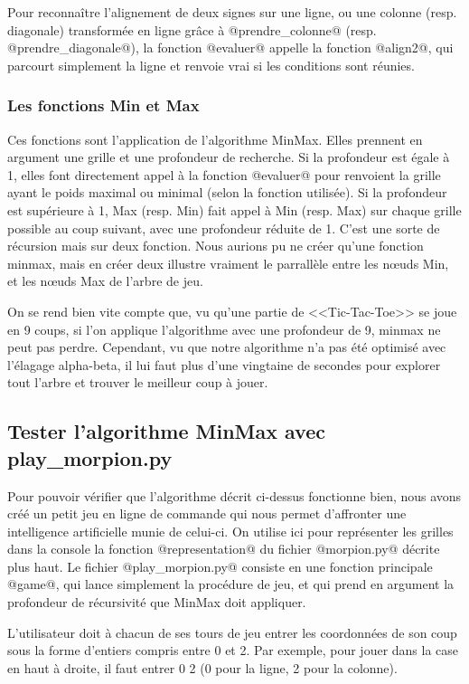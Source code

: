 \documentclass{article}
\begin{document}
Pour reconnaître l'alignement de deux signes sur une ligne, ou une colonne (resp. diagonale) transformée en ligne grâce à @prendre\_colonne@ (resp. @prendre\_diagonale@), la fonction @evaluer@ appelle la fonction @align2@, qui parcourt simplement la ligne et renvoie vrai si les conditions sont réunies.

\subsubsection{Les fonctions Min et Max}

Ces fonctions sont l'application de l'algorithme MinMax. Elles prennent en argument une grille et une profondeur de recherche. Si la profondeur est égale à 1, elles font directement appel à la fonction @evaluer@ pour renvoient la grille ayant le poids maximal ou minimal (selon la fonction utilisée). Si la profondeur est supérieure à 1, Max (resp. Min) fait appel à Min (resp. Max) sur chaque grille possible au coup suivant, avec une profondeur réduite de 1. C'est une sorte de récursion mais sur deux fonction. Nous aurions pu ne créer qu'une fonction minmax, mais en créer deux illustre vraiment le parrallèle entre les nœuds Min, et les nœuds Max de l'arbre de jeu.

On se rend bien vite compte que, vu qu'une partie de <<Tic-Tac-Toe>> se joue en 9 coups, si l'on applique l'algorithme avec une profondeur de 9, minmax ne peut pas perdre. Cependant, vu que notre algorithme n'a pas été optimisé avec l'élagage alpha-beta, il lui faut plus d'une vingtaine de secondes pour explorer tout l'arbre et trouver le meilleur coup à jouer.


\subsection{Tester l'algorithme MinMax avec play\_morpion.py}

Pour pouvoir vérifier que l'algorithme décrit ci-dessus fonctionne bien, nous avons créé un petit jeu en ligne de commande qui nous permet d'affronter une intelligence artificielle munie de celui-ci. On utilise ici pour représenter les grilles dans la console la fonction @representation@ du fichier @morpion.py@ décrite plus haut. Le fichier @play_morpion.py@ consiste en une fonction principale @game@, qui lance simplement la procédure de jeu, et qui prend en argument la profondeur de récursivité que MinMax doit appliquer.

L'utilisateur doit à chacun de ses tours de jeu entrer les coordonnées de son coup sous la forme d'entiers compris entre 0 et 2. Par exemple, pour jouer dans la case en haut à droite, il faut entrer 0 2 (0 pour la ligne, 2 pour la colonne).
\end{document}
